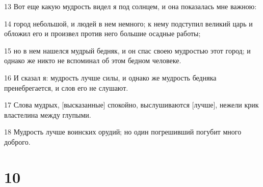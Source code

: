\par 13 Вот еще какую мудрость видел я под солнцем, и она показалась мне важною:
\par 14 город небольшой, и людей в нем немного; к нему подступил великий царь и обложил его и произвел против него большие осадные работы;
\par 15 но в нем нашелся мудрый бедняк, и он спас своею мудростью этот город; и однако же никто не вспоминал об этом бедном человеке.
\par 16 И сказал я: мудрость лучше силы, и однако же мудрость бедняка пренебрегается, и слов его не слушают.
\par 17 Слова мудрых, [высказанные] спокойно, выслушиваются [лучше], нежели крик властелина между глупыми.
\par 18 Мудрость лучше воинских орудий; но один погрешивший погубит много доброго.

\chapter{10}

